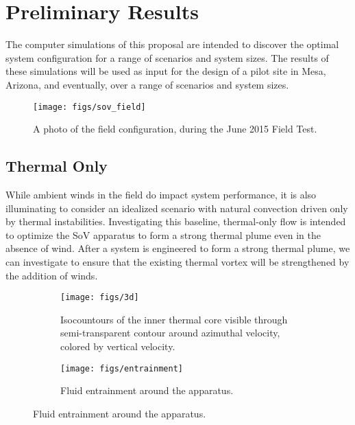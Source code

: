  
\section{Preliminary Results}
\label{sec:results}

The computer simulations of this proposal are intended to discover the
optimal system configuration for a range of scenarios and system
sizes. The results of these simulations will be used as input for the
design of a pilot site in Mesa, Arizona, and eventually, over a range of
scenarios and system sizes. 

  \begin{figure}[!htb]
   \begin{center}
    \texttt{[image: figs/sov\_field]}
    \caption{A photo of the field configuration, during the June 2015
    Field Test.}
    \label{fig:field_real}
   \end{center}
  \end{figure}

\subsection{Thermal Only}

While ambient winds in the field do impact system performance, it is
also illuminating to consider an idealized scenario with natural convection
driven only by thermal instabilities. Investigating this baseline,
thermal-only flow is intended to optimize the SoV apparatus to form a
strong thermal plume even in the absence of wind. After a system is
engineered to form a strong thermal plume, we can investigate to ensure
that the existing thermal vortex will be strengthened by the addition of
winds. 

\begin{figure}[htb]

 \begin{subfigure}{.55\textwidth}
  \centering
  \texttt{[image: figs/3d]}
  \caption{Isocountours of the inner thermal core
  visible through semi-transparent contour around azimuthal velocity,
  colored by vertical velocity. }
  \label{fig:thermal}  
 \end{subfigure}%
 \begin{subfigure}{.4\textwidth}
  \centering
  \texttt{[image: figs/entrainment]}%
  \caption{Fluid entrainment around the apparatus.} 
  \label{fig:entrain}  
 \end{subfigure}%
\end{figure}

